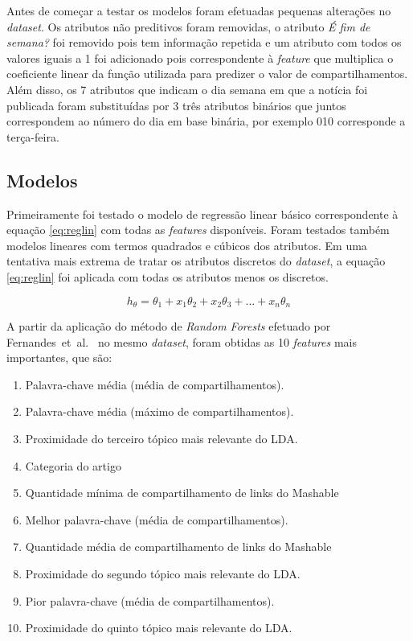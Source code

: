\documentclass[10pt,twocolumn,letterpaper]{article}
\newcommand{\CITEN}[2]{\mbox{#1 et al. \cite{#2}}}
\begin{document}
Antes de começar a testar os modelos foram efetuadas pequenas alterações no \textit{dataset}. Os atributos não preditivos foram removidas, o atributo \textit{É fim de semana?} foi removido pois tem informação repetida e um atributo com todos os valores iguais a 1 foi adicionado pois correspondente à \textit{feature} que multiplica o coeficiente linear da função utilizada para predizer o valor de compartilhamentos. Além disso, os 7 atributos que indicam o dia semana em que a notícia foi publicada foram substituídas por 3 três atributos binários que juntos correspondem ao número do dia em base binária, por exemplo 010 corresponde a terça-feira.

\subsection{Modelos}

Primeiramente foi testado o modelo de regressão linear básico correspondente à equação \ref{eq:reglin} com todas as \textit{features} disponíveis. Foram testados também modelos lineares com termos quadrados e cúbicos dos atributos. Em uma tentativa mais extrema de tratar os atributos discretos do \textit{dataset}, a equação \ref{eq:reglin} foi aplicada com todas os atributos menos os discretos.

\begin{equation}
	h_{\theta} = \theta_1 + x_1 \theta_2 + x_2 \theta_3 + \dots +  x_n \theta_n
	\label{eq:reglin}
\end{equation}

A partir da aplicação do método de \textit{Random Forests} efetuado por \CITEN{Fernandes}{kf} no mesmo \textit{dataset}, foram obtidas as 10 \textit{features} mais importantes, que são:

\begin{enumerate}
	\item Palavra-chave média (média de compartilhamentos).
	\item Palavra-chave média (máximo de compartilhamentos).
	\item Proximidade do terceiro tópico mais relevante do LDA.
	\item Categoria do artigo 
	\item Quantidade mínima de compartilhamento de links do Mashable
	\item Melhor palavra-chave (média de compartilhamentos).
	\item Quantidade média de compartilhamento de links do Mashable
	\item Proximidade do segundo tópico mais relevante do LDA.
	\item Pior palavra-chave (média de compartilhamentos).
	\item Proximidade do quinto tópico mais relevante do LDA.
\end{enumerate}
\end{document}

